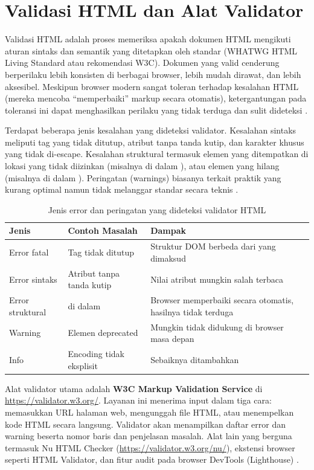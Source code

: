 \section{Validasi HTML dan Alat Validator}

Validasi HTML adalah proses memeriksa apakah dokumen HTML mengikuti aturan sintaks dan semantik yang ditetapkan oleh standar (WHATWG HTML Living Standard atau rekomendasi W3C). Dokumen yang valid cenderung berperilaku lebih konsisten di berbagai browser, lebih mudah dirawat, dan lebih aksesibel. Meskipun browser modern sangat toleran terhadap kesalahan HTML (mereka mencoba ``memperbaiki'' markup secara otomatis), ketergantungan pada toleransi ini dapat menghasilkan perilaku yang tidak terduga dan sulit dideteksi \cite{w3cValidator}.

Terdapat beberapa jenis kesalahan yang dideteksi validator. Kesalahan sintaks meliputi tag yang tidak ditutup, atribut tanpa tanda kutip, dan karakter khusus yang tidak di-escape. Kesalahan struktural termasuk elemen yang ditempatkan di lokasi yang tidak diizinkan (misalnya  di dalam ), atau elemen yang hilang (misalnya  di dalam ). Peringatan (warnings) biasanya terkait praktik yang kurang optimal namun tidak melanggar standar secara teknis \cite{whatwgHtml}.

\begin{table}[htbp]
\centering
\begin{tabular}{|P{2.5cm}|P{4cm}|P{5.5cm}|}
\hline
\textbf{Jenis} & \textbf{Contoh Masalah} & \textbf{Dampak} \\
\hline
Error fatal & Tag tidak ditutup & Struktur DOM berbeda dari yang dimaksud \\
\hline
Error sintaks & Atribut tanpa tanda kutip & Nilai atribut mungkin salah terbaca \\
\hline
Error struktural &  di dalam  & Browser memperbaiki secara otomatis, hasilnya tidak terduga \\
\hline
Warning & Elemen deprecated & Mungkin tidak didukung di browser masa depan \\
\hline
Info & Encoding tidak eksplisit & Sebaiknya ditambahkan  \\
\hline
\end{tabular}
\caption{Jenis error dan peringatan yang dideteksi validator HTML}
\end{table}

Alat validator utama adalah \textbf{W3C Markup Validation Service} di \url{https://validator.w3.org/}. Layanan ini menerima input dalam tiga cara: memasukkan URL halaman web, mengunggah file HTML, atau menempelkan kode HTML secara langsung. Validator akan menampilkan daftar error dan warning beserta nomor baris dan penjelasan masalah. Alat lain yang berguna termasuk Nu HTML Checker (\url{https://validator.w3.org/nu/}), ekstensi browser seperti HTML Validator, dan fitur audit pada browser DevTools (Lighthouse) \cite{w3cValidator}.

